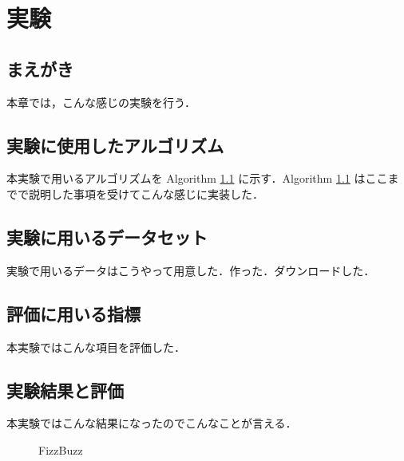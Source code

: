 \chapter{実験}
\label{sec:gradient_methods}

\section{まえがき}
本章では，こんな感じの実験を行う．

\section{実験に使用したアルゴリズム}
\label{sec:algorithm}
本実験で用いるアルゴリズムを Algorithm \ref{alg1} に示す．Algorithm \ref{alg1} はここまでで説明した事項を受けてこんな感じに実装した．

\section{実験に用いるデータセット}
実験で用いるデータはこうやって用意した．作った．ダウンロードした．

\section{評価に用いる指標}
\label{sec:criteria}
本実験ではこんな項目を評価した．

\section{実験結果と評価}
\label{sec:evaluation}
本実験ではこんな結果になったのでこんなことが言える．

\begin{figure}[!t]
  \begin{algorithm}[H]
    \caption{FizzBuzz}
    \label{alg1}
  \end{algorithm}
\end{figure}


